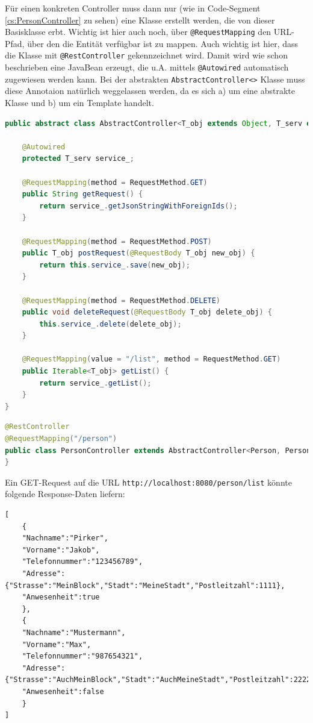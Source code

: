 Für einen konkreten Controller muss dann nur (wie in Code-Segment \ref{cs:PersonController} zu sehen) eine Klasse erstellt werden, die von dieser Basisklasse erbt. Wichtig ist hier auch noch, über \verb|@RequestMapping|  den URL-Pfad, über den die Entität verfügbar ist zu mappen. Auch wichtig ist hier, dass die Klasse mit \verb|@RestController| gekennzeichnet wird. Damit wird wie schon beschrieben eine JavaBean erzeugt, die u.A. mittels \verb|@Autowired| automatisch zugewiesen werden kann. Bei der abstrakten \verb|AbstractController<>| Klasse muss diese Annotaion natürlich weggelassen werden, da es sich a) um eine abstrakte Klasse und b) um ein Template handelt.

\scriptsize
\begin{lstlisting}[caption=AbstractController.java, label=cs:AbstractController, language=Java]
public abstract class AbstractController<T_obj extends Object, T_serv extends AbstractServiceInterface<T_obj>> {

	@Autowired
	protected T_serv service_;
	
	@RequestMapping(method = RequestMethod.GET)
	public String getRequest() {
		return service_.getJsonStringWithForeignIds();
	}
	
	@RequestMapping(method = RequestMethod.POST)
	public T_obj postRequest(@RequestBody T_obj new_obj) {
		return this.service_.save(new_obj);
	}
	
	@RequestMapping(method = RequestMethod.DELETE)
	public void deleteRequest(@RequestBody T_obj delete_obj) {
		this.service_.delete(delete_obj);
	}
	
	@RequestMapping(value = "/list", method = RequestMethod.GET)
	public Iterable<T_obj> getList() {
		return service_.getList();
	}
}
\end{lstlisting}

\begin{lstlisting}[caption=PersonController.java, label=cs:PersonController, language=Java]
@RestController
@RequestMapping("/person")
public class PersonController extends AbstractController<Person, PersonService>{
}
\end{lstlisting}
\normalsize

Ein GET-Request auf die URL \verb|http://localhost:8080/person/list| könnte folgende Response-Daten liefern:

\scriptsize
\begin{lstlisting}
[
	{	
	"Nachname":"Pirker",
	"Vorname":"Jakob",
	"Telefonnummer":"123456789",
	"Adresse":{"Strasse":"MeinBlock","Stadt":"MeineStadt","Postleitzahl":1111},
	"Anwesenheit":true
	},
	{	
	"Nachname":"Mustermann",
	"Vorname":"Max",
	"Telefonnummer":"987654321",
	"Adresse":{"Strasse":"AuchMeinBlock","Stadt":"AuchMeineStadt","Postleitzahl":2222},
	"Anwesenheit":false
	}
]
\end{lstlisting}
\normalsize

